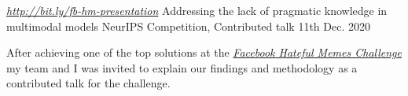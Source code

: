 
\begin{cventries}

  \cventry
    {\href{http://bit.ly/fb-hm-presentation}{\textit{http://bit.ly/fb-hm-presentation}}} %
    {Addressing the lack of pragmatic knowledge in multimodal models} %
    {NeurIPS Competition, Contributed talk} %
    {11th Dec. 2020} %
    {
      \begin{cvitems} %
        \item After achieving one of the top solutions at the \href{https://ai.facebook.com/blog/hateful-memes-challenge-and-data-set/}{\textit{Facebook Hateful Memes Challenge}} my team and I was invited to explain our findings and methodology as a contributed talk for the challenge.
      \end{cvitems}
    }

\end{cventries}
